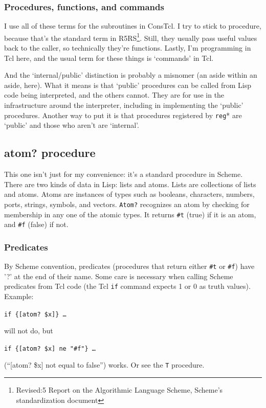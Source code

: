 \documentclass[twoside,9pt]{report}
\begin{document}
\begin{pulledtext}
\subsubsection{Procedures, functions, and commands}
\label{procedures,-functions,-and-commands}


I use all of these terms for the subroutines in ConsTcl. I try to stick to procedure, because that's the standard term in R5RS\footnote{Revised:5 Report on the Algorithmic Language Scheme, Scheme's standardization document}. Still, they usually pass useful values back to the caller, so technically they're functions. Lastly, I'm programming in Tcl here, and the usual term for these things is `commands' in Tcl.


And the `internal/public' distinction is probably a misnomer (an aside within an aside, here). What it means is that `public' procedures can be called from Lisp code being interpreted, and the others cannot. They are for use in the infrastructure around the interpreter, including in implementing the `public' procedures. Another way to put it is that procedures registered by \texttt{reg}* are `public' and those who aren't are `internal'.

\end{pulledtext}

\subsection{atom? procedure}
\label{atom?-procedure}


This one isn't just for my convenience: it's a standard procedure in Scheme. There are two kinds of data in Lisp: lists and atoms. Lists are collections of lists and atoms. Atoms are instances of types such as booleans, characters, numbers, ports, strings, symbols, and vectors. \texttt{Atom?} recognizes an atom by checking for membership in any one of the atomic types. It returns \texttt{\#t} (true) if it is an atom, and \texttt{\#f} (false) if not.


\begin{pulledtext}
\subsubsection{Predicates}
\label{predicates}


By Scheme convention, predicates (procedures that return either \texttt{\#t} or \texttt{\#f}) have '?' at the end of their name. Some care is necessary when calling Scheme predicates from Tcl code (the Tcl \texttt{if} command expects 1 or 0 as truth values). Example:


\texttt{if \{[atom? \$x]\} \ldots }


will not do, but


\texttt{if \{[atom? \$x] ne "\#f"\} \ldots }


(``[atom? \$x] not equal to false'') works. Or see the \texttt{T} procedure.

\end{pulledtext}
\end{document}
